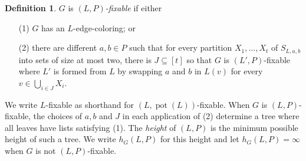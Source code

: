 \documentclass[12pt]{article}
\theoremstyle{plain}
\theoremstyle{definition}
\newtheorem{defn}{Definition}
\theoremstyle{remark}
\newcommand{\irange}[1]{\left[#1\right]}
\newcommand{\pot}{\operatorname{pot}}
\begin{document}
\begin{defn}
$G$ is \emph{$(L, P)$-fixable} if either
\begin{enumerate}
\item[(1)] $G$ has an $L$-edge-coloring; or
\item[(2)] there are different $a,b \in P$ such that for every partition $X_1, \ldots, X_t$ of $S_{L,a,b}$ into sets of size at most two, 
      there is $J \subseteq \irange{t}$ so that $G$ is $(L', P)$-fixable where $L'$ is formed from $L$ by swapping $a$ and $b$ in $L(v)$ for every $v \in \bigcup_{i \in J} X_i$.
\end{enumerate}
\end{defn}

We write $L$-fixable as shorthand for $(L, \pot(L))$-fixable. When $G$ is $(L, P)$-fixable, the choices of $a,b$ and $J$ in each application of (2) determine a tree where all leaves have lists satisfying (1).  The \emph{height} of $(L, P)$ is the minimum possible height of such a tree.  We write $h_G(L, P)$ for this height and let $h_G(L, P) = \infty$ when $G$ is not $(L,P)$-fixable. 
\end{document}
